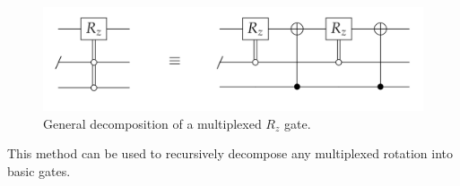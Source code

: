 \documentclass[../../../dissertation.tex]{subfiles}
\begin{document}
\begin{figure}[!h]
	\centering
	\includegraphics[scale=0.35]{img/QCircuit/diagonal/qcGenDecomp.png}
	\caption{General decomposition of a multiplexed $R_z$ gate.} 
	\label{fig:shendeGeneralRz}
\end{figure}
This method can be used to recursively decompose any multiplexed rotation into basic gates.
\end{document}
